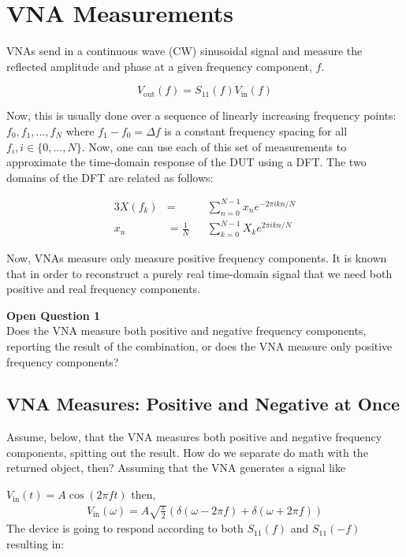 \documentclass{article}
\begin{document}
\section{VNA Measurements}
\label{sec:vna_measurements}
VNAs send in a continuous wave (CW) sinusoidal signal and measure the reflected
amplitude and phase at a given frequency component, $ f $.

\[
   V_{\text{out}}(f) = S_{\text{11}}(f)V_{\text{in}}(f)
\]

Now, this is usually done over a sequence of linearly increasing frequency
points: $ f_0, f_1 , \ldots , f_N $ where $ f_1 - f_0 = \Delta f $ is a constant
frequency spacing for all $ f_i, i \in \{ 0,...,N \}$. Now, one can use each of
this set of measurements to approximate the time-domain response of the DUT
using a DFT. The two domains of the DFT are related as follows:

\begin{alignat*}{3}
   X(f_k) &= &&\sum^{N-1}_{n=0} x_n e^{-2 \pi i k n / N} \\
   x_n &= \frac{1}{N} &&\sum^{N-1}_{k=0} X_k e^{2\pi i k n / N}
\end{alignat*}

Now, VNAs measure only measure positive frequency components. It is known that
in order to reconstruct a purely real time-domain signal that we need both
positive and real frequency components.

\begin{framed}
   \textbf{Open Question 1} \\
   Does the VNA measure both positive and negative frequency components,
   reporting the result of the combination, or does the VNA measure only positive frequency
   components?
\end{framed}

\subsection{VNA Measures: Positive and Negative at Once}
\label{sub:vna_measures_positive_and_negative_at_once}
Assume, below, that the VNA measures both positive and negative frequency
components, spitting out the result. How do we separate do math with the
returned object, then? Assuming that the VNA generates a signal like

$ V_{\text{in}}(t) = A \cos(2 \pi f t) $ then,
\begin{align*}
   V_{\text{in}}(\omega) = A\sqrt{\frac{\pi}{2}} \left( \delta(\omega - 2\pi f) +
   \delta(\omega + 2\pi f) \right)
\end{align*}
The device is going to respond according to both $ S_{11}(f) $ and $
S_{11}(-f) $ resulting in:
\end{document}
